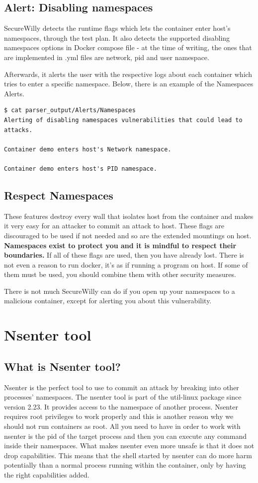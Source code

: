 \subsection{Alert: Disabling namespaces}
SecureWilly detects the runtime flags which lets the container enter host's namespaces, through the test plan. It also detects the supported disabling namespaces options in Docker compose file - at the time of writing, the ones that are implemented in .yml files are network, pid and user namespace.

Afterwards, it alerts the user with the respective logs about each container which tries to enter a specific namespace. Below, there is an example of the Namespaces Alerts.

\begin{lstlisting}[style=terminal]
$ cat parser_output/Alerts/Namespaces 
Alerting of disabling namespaces vulnerabilities that could lead to attacks.

Container demo enters host's Network namespace.

Container demo enters host's PID namespace.
\end{lstlisting}

\subsection{Respect Namespaces}
These features destroy every wall that isolates host from the container and makes it very easy for an attacker to commit an attack to host. These flags are discouraged to be used if not needed and so are the extended mountings on host. \textbf{Namespaces exist to protect you and it is mindful to respect their boundaries.} If all of these flags are used, then you have already lost. There is not even a reason to run docker, it's as if running a program on host. If some of them must be used, you should combine them with other security measures. 

There is not much SecureWilly can do if you open up your namespaces to a malicious container, except for alerting you about this vulnerability. 

\section{Nsenter tool} \label{nsentertools}
\subsection{What is Nsenter tool?}
Nsenter is the perfect tool to use to commit an attack by breaking into other processes' namespaces. The nsenter tool is part of the util-linux package since version 2.23. It provides access to the namespace of another process. Nsenter requires root privileges to work properly and this is another reason why we should not run containers as root. All you need to have in order to work with nsenter is the pid of the target process and then you can execute any command inside their namespaces. 
What makes nsenter even more unsafe is that it does not drop capabilities. This means that the shell started by nsenter can do more harm potentially than a normal process running within the container, only by having the right capabilities added.

